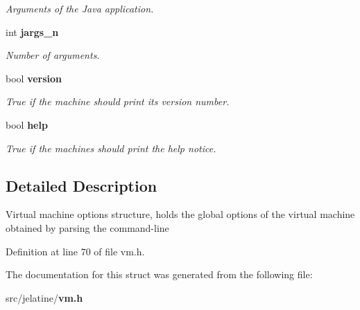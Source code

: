\begin{DoxyCompactItemize}
\begin{DoxyCompactList}\small\item\em Arguments of the Java application. \item\end{DoxyCompactList}\item 
int {\bf jargs\_\-n}\label{structoptions__t_a5f618922fd285d3a2417c5db5f854bec}

\begin{DoxyCompactList}\small\item\em Number of arguments. \item\end{DoxyCompactList}\item 
bool {\bf version}\label{structoptions__t_a5f1d09febff702a52fdd5ca0a2a423c8}

\begin{DoxyCompactList}\small\item\em True if the machine should print its version number. \item\end{DoxyCompactList}\item 
bool {\bf help}\label{structoptions__t_a93514eee365ca71e5e6f48e5e642b5ae}

\begin{DoxyCompactList}\small\item\em True if the machines should print the help notice. \item\end{DoxyCompactList}\end{DoxyCompactItemize}


\subsection{Detailed Description}
Virtual machine options structure, holds the global options of the virtual machine obtained by parsing the command-\/line 

Definition at line 70 of file vm.h.



The documentation for this struct was generated from the following file:\begin{DoxyCompactItemize}
\item 
src/jelatine/{\bf vm.h}\end{DoxyCompactItemize}
